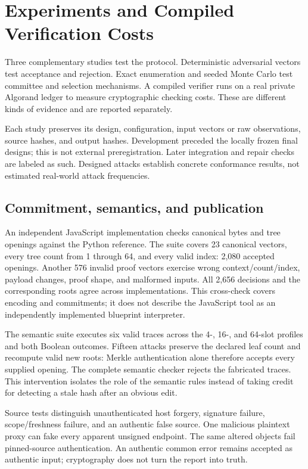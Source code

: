 \section{Experiments and Compiled Verification Costs}
\label{sec:experiments}

Three complementary studies test the protocol. Deterministic adversarial vectors test acceptance and rejection. Exact enumeration and seeded Monte Carlo test committee and selection mechanisms. A compiled verifier runs on a real private Algorand ledger to measure cryptographic checking costs. These are different kinds of evidence and are reported separately.

Each study preserves its design, configuration, input vectors or raw observations, source hashes, and output hashes. Development preceded the locally frozen final designs; this is not external preregistration. Later integration and repair checks are labeled as such. Designed attacks establish concrete conformance results, not estimated real-world attack frequencies.

\subsection{Commitment, semantics, and publication}

An independent JavaScript implementation checks canonical bytes and tree openings against the Python reference. The suite covers 23 canonical vectors, every tree count from 1 through 64, and every valid index: 2,080 accepted openings. Another 576 invalid proof vectors exercise wrong context/count/index, payload changes, proof shape, and malformed inputs. All 2,656 decisions and the corresponding roots agree across implementations. This cross-check covers encoding and commitments; it does not describe the JavaScript tool as an independently implemented blueprint interpreter.

The semantic suite executes six valid traces across the 4-, 16-, and 64-slot profiles and both Boolean outcomes. Fifteen attacks preserve the declared leaf count and recompute valid new roots: Merkle authentication alone therefore accepts every supplied opening. The complete semantic checker rejects the fabricated traces. This intervention isolates the role of the semantic rules instead of taking credit for detecting a stale hash after an obvious edit.

Source tests distinguish unauthenticated host forgery, signature failure, scope/freshness failure, and an authentic false source. One malicious plaintext proxy can fake every apparent unsigned endpoint. The same altered objects fail pinned-source authentication. An authentic common error remains accepted as authentic input; cryptography does not turn the report into truth.

